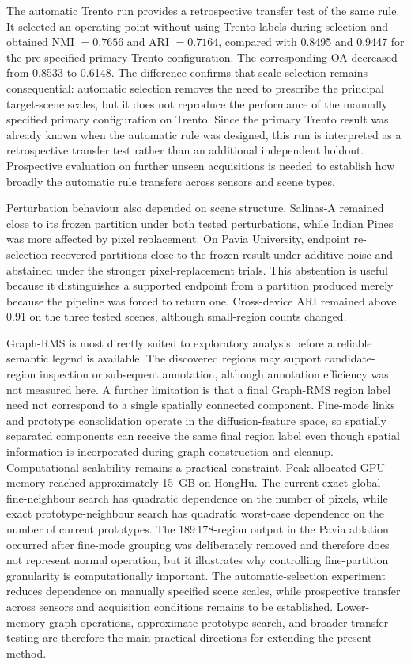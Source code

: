 \documentclass[10pt,a4paper,fleqn]{article}
\begin{document}
The automatic Trento run provides a retrospective transfer test of the same
rule. It selected an operating point without using Trento labels during
selection and obtained NMI \(=0.7656\) and ARI \(=0.7164\), compared with
0.8495 and 0.9447 for the pre-specified primary Trento configuration. The
corresponding OA decreased from 0.8533 to 0.6148. The difference confirms
that scale selection remains consequential: automatic selection removes the
need to prescribe the principal target-scene scales, but it does not reproduce
the performance of the manually specified primary configuration on Trento.
Since the primary Trento result was already known when the automatic rule was
designed, this run is interpreted as a retrospective transfer test rather than
an additional independent holdout. Prospective evaluation on further unseen
acquisitions is needed to establish how broadly the automatic rule transfers
across sensors and scene types.

Perturbation behaviour also depended on scene structure. Salinas-A remained
close to its frozen partition under both tested perturbations, while Indian
Pines was more affected by pixel replacement. On Pavia University, endpoint
re-selection recovered partitions close to the frozen result under additive
noise and abstained under the stronger pixel-replacement trials. This
abstention is useful because it distinguishes a supported endpoint from a
partition produced merely because the pipeline was forced to return one.
Cross-device ARI remained above 0.91 on the three tested scenes, although
small-region counts changed.

Graph-RMS is most directly suited to exploratory analysis before a reliable
semantic legend is available. The discovered regions may support
candidate-region inspection or subsequent annotation, although annotation
efficiency was not measured here. A further limitation is that a final
Graph-RMS region label need not correspond to a single spatially connected
component. Fine-mode links and prototype consolidation operate in the
diffusion-feature space, so spatially separated components can receive the
same final region label even though spatial information is incorporated during
graph construction and cleanup. Computational scalability remains a practical
constraint. Peak allocated GPU memory reached approximately 15~GB on HongHu.
The current exact global fine-neighbour search has quadratic dependence on the
number of pixels, while exact prototype-neighbour search has quadratic
worst-case dependence on the number of current prototypes. The 189\,178-region output in
the Pavia ablation occurred after fine-mode grouping was deliberately removed
and therefore does not represent normal operation, but it illustrates why
controlling fine-partition granularity is computationally important. The
automatic-selection experiment reduces dependence on manually specified scene
scales, while prospective transfer across sensors and acquisition conditions
remains to be established. Lower-memory graph operations, approximate
prototype search, and broader transfer testing are therefore the main
practical directions for extending the present method.
\end{document}
